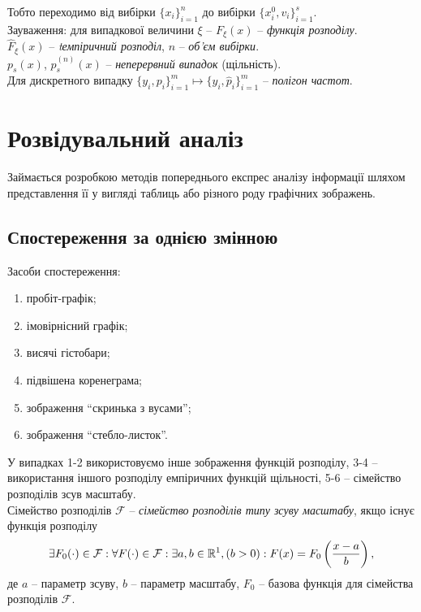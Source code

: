 Тобто переходимо від вибірки $\{x_i\}_{i=1}^n$ до вибірки $\{x_i^0, v_i\}_{i=1}^s$. \\

Зауваження: для випадкової величини $\xi$ -- $F_\xi(x)$ -- \textit{функція розподілу}. \\

$\widehat{F}_\xi(x)$ -- \textit{tемпіричний розподіл}, $n$ -- \textit{об'єм вибірки}. \\

$p_s(x)$, $\widehat{p}_s^{(n)}(x)$ -- \textit{неперервний випадок} (щільність). \\

Для дискретного випадку $\{y_i, p_i\}_{i=1}^m \mapsto \{ y_i, \widehat{p}_i\}_{i=1}^m$ -- \textit{полігон частот}.
\section{Розвідувальний аналіз}
Займається розробкою методів попереднього експрес аналізу інформації шляхом представлення її у вигляді таблиць або різного роду графічних зображень.
\subsection{Спостереження за однією змінною}
Засоби спостереження:
\begin{enumerate}
	\item пробіт-графік;
	\item імовірнісний графік;
	\item висячі гістобари;
	\item підвішена коренеграма;
	\item зображення ``скринька з вусами'';
	\item зображення ``стебло-листок''.
\end{enumerate}
У випадках 1-2 використовуємо інше зображення функцій розподілу, 3-4 -- використання іншого розподілу емпіричних функцій щільності, 5-6 -- сімейство розподілів зсув масштабу. \\

Сімейство розподілів $\mathcal{F}$ -- \textit{сімейство розподілів типу зсуву масштабу}, якщо існує функція розподілу \[ \exists F_0(\cdot) \in \mathcal{F}: \forall F(\cdot) \in \mathcal{F}: \exists a, b \in \mathbb{R}^1, (b > 0): F(x) = F_0\left(\dfrac{x-a}{b}\right), \] де $a$ -- параметр зсуву, $b$ -- параметр масштабу, $F_0$ -- базова функція для сімейства розподілів $\mathcal{F}$. \\


